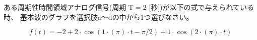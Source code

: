 ある周期性時間領域アナログ信号(周期 $\textrm{T} = 2$ [秒])が以下の式で与えられている時、
基本波のグラフを選択肢a〜dの中から1つ選びなさい。

\[
f(t) = 
-2
+ 2 \cdot \cos( 1 \cdot ( \pi ) \cdot t - \pi/2)
+ 1 \cdot \cos( 2 \cdot ( \pi ) \cdot t )
\]
